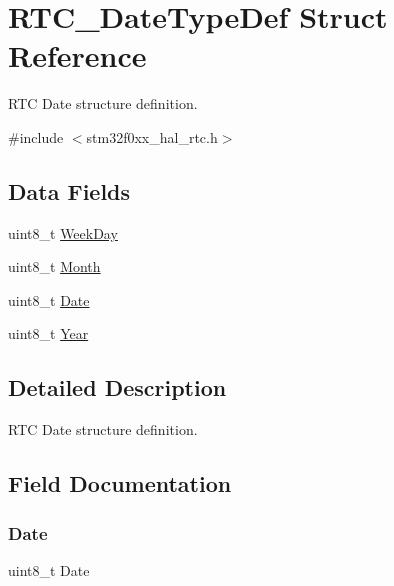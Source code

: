 \hypertarget{struct_r_t_c___date_type_def}{}\section{R\+T\+C\+\_\+\+Date\+Type\+Def Struct Reference}
\label{struct_r_t_c___date_type_def}


R\+TC Date structure definition.  




{\ttfamily \#include $<$stm32f0xx\+\_\+hal\+\_\+rtc.\+h$>$}

\subsection*{Data Fields}
\begin{DoxyCompactItemize}
\item 
uint8\+\_\+t \hyperlink{struct_r_t_c___date_type_def_af39df3e46151584e8cb28dfb7de43dec}{Week\+Day}
\item 
uint8\+\_\+t \hyperlink{struct_r_t_c___date_type_def_aee1e733c977d621eae2f655b3fd2a734}{Month}
\item 
uint8\+\_\+t \hyperlink{struct_r_t_c___date_type_def_a784bb90289154f1c4b6724fed7265645}{Date}
\item 
uint8\+\_\+t \hyperlink{struct_r_t_c___date_type_def_ab1fa72fe40c7b93c140c766dec410e29}{Year}
\end{DoxyCompactItemize}


\subsection{Detailed Description}
R\+TC Date structure definition. 

\subsection{Field Documentation}
\mbox{\label{struct_r_t_c___date_type_def_a784bb90289154f1c4b6724fed7265645}} 
\subsubsection{\texorpdfstring{Date}{Date}}
{\footnotesize\ttfamily uint8\+\_\+t Date}

